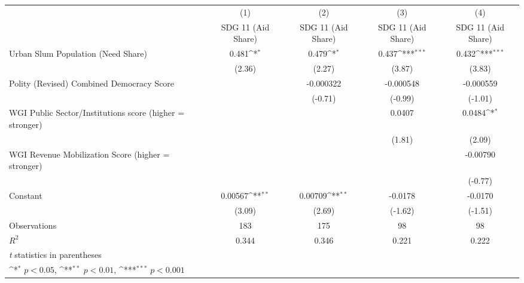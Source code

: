 {
\def\sym#1{\ifmmode^{#1}\else\(^{#1}\)\fi}
\begin{tabular}{l*{4}{c}}
\hline\hline
                &\multicolumn{1}{c}{(1)}&\multicolumn{1}{c}{(2)}&\multicolumn{1}{c}{(3)}&\multicolumn{1}{c}{(4)}\\
                &\multicolumn{1}{c}{SDG 11 (Aid Share)}&\multicolumn{1}{c}{SDG 11 (Aid Share)}&\multicolumn{1}{c}{SDG 11 (Aid Share)}&\multicolumn{1}{c}{SDG 11 (Aid Share)}\\
\hline
Urban Slum Population (Need Share)&    0.481\sym{*}  &    0.479\sym{*}  &    0.437\sym{***}&    0.432\sym{***}\\
                &   (2.36)         &   (2.27)         &   (3.87)         &   (3.83)         \\
[1em]
Polity (Revised) Combined Democracy Score&                  &-0.000322         &-0.000548         &-0.000559         \\
                &                  &  (-0.71)         &  (-0.99)         &  (-1.01)         \\
[1em]
WGI Public Sector/Institutions score (higher = stronger)&                  &                  &   0.0407         &   0.0484\sym{*}  \\
                &                  &                  &   (1.81)         &   (2.09)         \\
[1em]
WGI Revenue Mobilization Score (higher = stronger)&                  &                  &                  & -0.00790         \\
                &                  &                  &                  &  (-0.77)         \\
[1em]
Constant        &  0.00567\sym{**} &  0.00709\sym{**} &  -0.0178         &  -0.0170         \\
                &   (3.09)         &   (2.69)         &  (-1.62)         &  (-1.51)         \\
\hline
Observations    &      183         &      175         &       98         &       98         \\
\(R^{2}\)       &    0.344         &    0.346         &    0.221         &    0.222         \\
\hline\hline
\multicolumn{5}{l}{\footnotesize \textit{t} statistics in parentheses}\\
\multicolumn{5}{l}{\footnotesize \sym{*} \(p<0.05\), \sym{**} \(p<0.01\), \sym{***} \(p<0.001\)}\\
\end{tabular}
}
